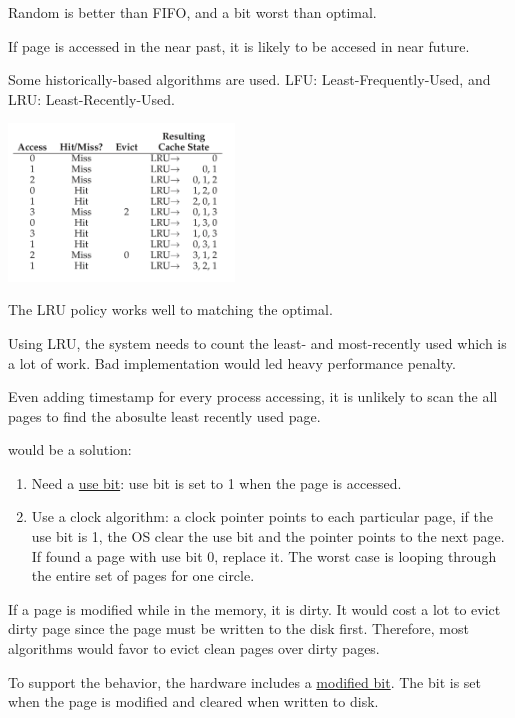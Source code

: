     Random is better than FIFO, and a bit worst than optimal.


    If page is accessed in the near past, it is likely to be accesed in near future.

    Some historically-based algorithms are used. LFU: Least-Frequently-Used, and
    LRU: Least-Recently-Used.

    \includegraphics[width=0.45\textwidth]{chapters/chapter1/Segmentation_Paging/LRU.png}

    The LRU policy works well to matching the optimal.


    Using LRU, the system needs to count the least- and most-recently used which is 
    a lot of work. Bad implementation would led heavy performance penalty.

    Even adding timestamp for every process accessing, it is unlikely to scan the all
    pages to find the abosulte least recently used page.

     would be a solution:
    \begin{enumerate}
        \item Need a \underline{use bit}: use bit is set to 1 when the page is accessed.
        \item Use a clock algorithm: a clock pointer points to each particular page,
        if the use bit is 1, the OS clear the use bit and the pointer points to the next page.
        If found a page with use bit 0, replace it. The worst case is looping through the entire
        set of pages for one circle.
    \end{enumerate}


    If a page is modified while in the memory, it is dirty. It would cost a lot to 
    evict dirty page since the page must be written to the disk first. Therefore, 
    most algorithms would favor to evict clean pages over dirty pages.

    To support the behavior, the hardware includes a \underline{modified bit}. The bit 
    is set when the page is modified and cleared when written to disk.

